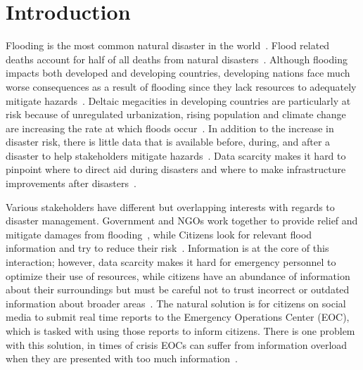 \chapter{Introduction} Flooding is the most common natural disaster in the
world~\cite{chanFloodRiskAsia2012}.  Flood related deaths account for half of
all deaths from natural disasters~\cite{ohlFloodingHumanHealth2000}. Although
flooding impacts both developed and developing countries, developing nations
face much worse consequences as a result of flooding since they lack resources
to adequately mitigate
hazards~\cite{quarantelliUrbanVulnerabilityDisasters2003}. Deltaic megacities
in developing countries are particularly at risk because of unregulated
urbanization, rising population and climate change are increasing the rate at
which floods occur~\cite{chanFloodRiskAsia2012}. In
addition to the increase in disaster risk, there is little data that is
available before, during, and after a disaster to help stakeholders mitigate
hazards~\cite{meierDigitalHumanitariansHow2015}. Data scarcity makes it hard to
pinpoint where to direct aid during disasters and where to make infrastructure
improvements after disasters~\cite{ranaMultidimensionalModelVulnerability2018}.

Various stakeholders have different but overlapping interests with regards to
disaster management. Government and NGOs work together to provide relief and
mitigate damages from flooding~\cite{chanResilientFloodRisk2018}, while Citizens
look for relevant flood information and try to reduce their
risk~\cite{viewegMicrobloggingTwoNatural2010}. Information is at the core of
this interaction; however, data scarcity makes it hard for emergency personnel
to optimize their use of resources, while citizens have an abundance of
information about their surroundings but must be careful not to trust incorrect
or outdated information about broader
areas~\cite{quarantelliProblematicalAspectsInformation1997}. The natural
solution is for citizens on social media to submit real time reports to the
Emergency Operations Center (EOC), which is tasked with using those reports to
inform citizens.  There is one problem with this solution, in times of crisis
EOCs can suffer from information overload when they are presented with too much
information~\cite{tierneyFacingUnexpectedDisaster2001}.

